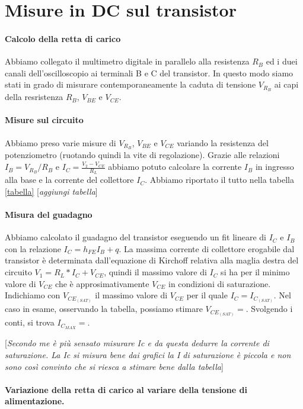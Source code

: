 \documentclass[10pt,a4paper]{article}
\newcommand{\rem}[1]{[\emph{#1}]}
\begin{document}
\section{Misure in DC sul transistor}
\paragraph{Calcolo della retta di carico}
Abbiamo collegato il multimetro digitale in parallelo alla resistenza $R_B$  ed i duei canali dell'oscilloscopio ai terminali B e C del transistor. In questo modo siamo stati in grado di misurare contemporaneamente la caduta di tensione $V_{R_B}$ ai capi della resristenza $R_B$, $V_{BE}$ e $V_{CE}$.
\paragraph{Misure sul circuito}
Abbiamo preso varie misure di $V_{R_B}$, $V_{BE}$ e $V_{CE}$  variando la resistenza del potenziometro (ruotando quindi la vite di regolazione). Grazie alle relazioni $I_B=V_{R_B}/R_B$ e $I_C=\frac{V_2-V_{CE}}{R_L}$ abbiamo potuto calcolare la corrente $I_B$ in ingresso alla base e la corrente del collettore $I_C$.
Abbiamo riportato il tutto nella tabella \ref{tabella}
\rem{aggiungi tabella}
\paragraph{Misura del guadagno}
Abbiamo calcolato il guadagno del transistor  eseguendo un fit lineare di $I_C$ e $I_B$ con la  relazione $I_C=h_{FE}I_B+q$.
La massima corrente di collettore erogabile dal transistor è determinata dall'equazione di Kirchoff relativa alla maglia destra del circuito  $V_1 = R_L*I_C + V_{CE}$, quindi il massimo valore di $I_C$ si ha per il minimo valore di $V_{CE}$ che è  approsimativamente $V_{CE}$ in condizioni di saturazione.
  Indichiamo con $V_ {CE_{(SAT)}}$  il massimo valore di $V_{CE}$ per il quale $I_C = I_{C_{(SAT)}}$. Nel caso in esame, osservando la tabella, possiamo  stimare $V_{CE_{(SAT)}}=$. Svolgendo i conti, si trova $I_{C_{MAX}} = $. 
 
 \rem{Secondo me è più sensato misurare Ic e da questa dedurre la corrente di saturazione. La Ic si misura bene dai grafici la I di saturazione è piccola e non sono così convinto che si riesca a stimare bene dalla tabella}
\paragraph{Variazione della retta di carico al variare della tensione di alimentazione.}
 
\end{document}
